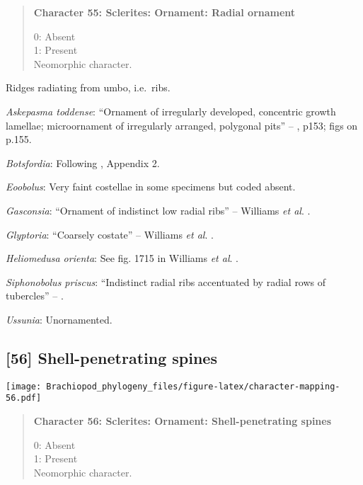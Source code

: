 \documentclass[openany]{book}
\theoremstyle{definition}
\theoremstyle{definition}
\theoremstyle{definition}
\theoremstyle{remark}
\begin{document}
\begin{quote}
\textbf{Character 55: Sclerites: Ornament: Radial ornament}

0: Absent\\
1: Present\\
Neomorphic character.
\end{quote}

Ridges radiating from umbo, i.e.~ribs.

\hypertarget{Askepasma_toddense-coding-55}{}
\emph{Askepasma toddense}: ``Ornament of irregularly developed,
concentric growth lamellae; microornament of irregularly arranged,
polygonal pits'' -- \citet{Williams2000LinguliformeaCraniiformea}, p153;
figs on p.155.

\hypertarget{Botsfordia-coding-55}{}
\emph{Botsfordia}: Following \citet{Williams1998Thediversity}, Appendix
2.

\hypertarget{Eoobolus-coding-55}{}
\emph{Eoobolus}: Very faint costellae in some specimens but coded
absent.

\hypertarget{Gasconsia-coding-55}{}
\emph{Gasconsia}: ``Ornament of indistinct low radial ribs'' -- Williams
\emph{et al}. \citeyearpar[p167]{Williams2000LinguliformeaCraniiformea}.

\hypertarget{Glyptoria-coding-55}{}
\emph{Glyptoria}: ``Coarsely costate'' -- Williams \emph{et al}.
\citeyearpar[p710]{Williams2000LinguliformeaCraniiformea}.

\hypertarget{Heliomedusa_orienta-coding-55}{}
\emph{Heliomedusa orienta}: See fig. 1715 in Williams \emph{et al}.
\citeyearpar{Williams2007Supplement}.

\hypertarget{Siphonobolus_priscus-coding-55}{}
\emph{Siphonobolus priscus}: ``Indistinct radial ribs accentuated by
radial rows of tubercles'' -- \citet{Popov2009Earlyontogeny}.

\hypertarget{Ussunia-coding-55}{}
\emph{Ussunia}: Unornamented.

\subsection*{{[}56{]} Shell-penetrating
spines}\label{shell-penetrating-spines}

\texttt{[image: Brachiopod\_phylogeny\_files/figure-latex/character-mapping-56.pdf]}

\begin{quote}
\textbf{Character 56: Sclerites: Ornament: Shell-penetrating spines}

0: Absent\\
1: Present\\
Neomorphic character.
\end{quote}
\end{document}
